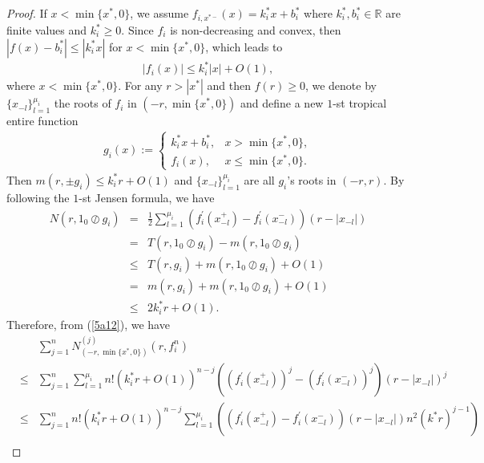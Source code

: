 \documentclass{article}
\begin{document}
\begin{proof}
    If $x<\min\{x^{*}, 0\}$, we assume $f_{i, x^{*-}}(x)=k_{i}^{*}x+b_{i}^{*}$ where $k_{i}^{*}, b_{i}^{*}\in\mathbb{R}$ are finite values and $k_{i}^{*}\geq 0$. Since $f_{i}$ is non-decreasing and convex, then $|f(x)-b_{i}^{*}|\leq |k_{i}^{*}x|$ for $x<\min\{x^{*}, 0\}$, which leads to
    \begin{eqnarray}\label{5a17}
        |f_{i}(x)|\leq k_{i}^{*}|x|+O(1),
    \end{eqnarray}
    where $x<\min\{x^{*}, 0\}$. For any $r>|x^{*}|$ and then $f(r)\geq 0$, we denote by $\{x_{-l}\}_{l=1}^{\mu_{i}}$ the roots of $f_{i}$ in $(-r, \min\{x^{*}, 0\})$ and define a new $1$-st tropical entire function
    \begin{eqnarray*}
        g_{i}(x):=\left\{\begin{array}{ll}
         k_{i}^{*}x+b_{i}^{*}, & x> \min\{x^{*}, 0\},\\
         f_{i}(x), & x\leq \min\{x^{*}, 0\}.
         \end{array}\right.
    \end{eqnarray*}
    Then $m(r, \pm g_{i})\leq k_{i}^{*}r+O(1)$ and $\{x_{-l}\}_{l=1}^{\mu_{i}}$ are all $g_{i}$'s roots in $(-r, r)$. By following the $1$-st Jensen formula, we have
    \begin{eqnarray*}
        N(r, 1_{0}\oslash g_{i})&=&\frac{1}{2}\sum_{l=1}^{\mu_{i}}(f_{i}^{'}(x_{-l}^{+})-f_{i}^{'}(x_{-l}^{-}))(r-|x_{-l}|)\\
        &=&T(r, 1_{0}\oslash g_{i})-m(r, 1_{0}\oslash g_{i})\\
        &\leq&T(r, g_{i})+m(r, 1_{0}\oslash g_{i})+O(1)\\
        &=&m(r, g_{i})+m(r, 1_{0}\oslash g_{i})+O(1)\\
        &\leq&2k_{i}^{*}r+O(1).
    \end{eqnarray*}
    Therefore, from (\ref{5a12}), we have 
    \begin{eqnarray}\label{5a18}
        &&\sum_{j=1}^{n}N_{(-r, \min\{x^{*}, 0\})}^{(j)}(r, f_{i}^{n})\nonumber\\
        &\leq&\sum_{j=1}^{n}\sum_{l=1}^{\mu_{i}}n!\left(k_{i}^{*}r+O(1)\right)^{n-j}\left((f_{i}^{'}(x_{-l}^{+}))^{j}-(f_{i}^{'}(x_{-l}^{-}))^{j}\right)(r-|x_{-l}|)^{j}\nonumber\\
        &\leq&\sum_{j=1}^{n}n!\left(k_{i}^{*}r+O(1)\right)^{n-j}\sum_{l=1}^{\mu_{i}}\left((f_{i}^{'}(x_{-l}^{+})-f_{i}^{'}(x_{-l}^{-}))(r-|x_{-l}|)n^{2}(k^{*}r)^{j-1}\right)\nonumber\\

\end{eqnarray}
\end{proof}
\end{document}
